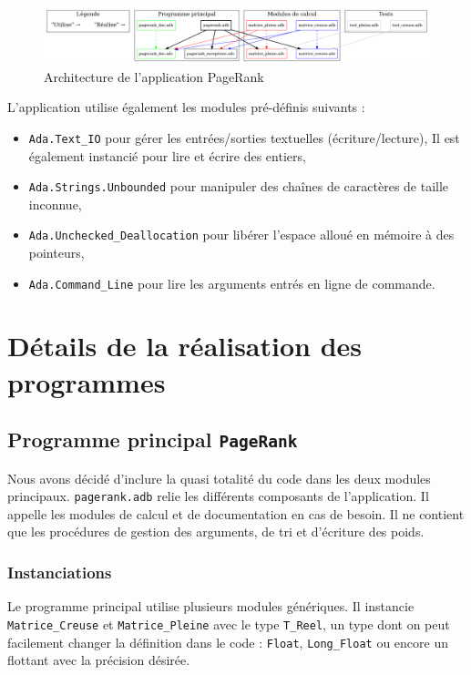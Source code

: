\documentclass{article}
\begin{document}
\begin{figure}[H]
    \centering
    \includegraphics[width=\textwidth]{archi.png}
    \caption{Architecture de l'application PageRank}
\end{figure}

\noindent L'application utilise également les modules pré-définis suivants :
\begin{itemize}
    \item \texttt{Ada.Text\_IO} pour gérer les entrées/sorties textuelles (écriture/lecture), Il est également instancié pour lire et écrire des entiers,
    \item \texttt{Ada.Strings.Unbounded} pour manipuler des chaînes de caractères de taille inconnue,
    \item \texttt{Ada.Unchecked\_Deallocation} pour libérer l'espace alloué en mémoire à des pointeurs,
    \item \texttt{Ada.Command\_Line} pour lire les arguments entrés en ligne de commande.
\end{itemize}

\section{Détails de la réalisation des programmes}

\subsection{Programme principal \texttt{PageRank}}

Nous avons décidé d'inclure la quasi totalité du code dans les deux modules principaux.  \texttt{pagerank.adb} relie les différents composants de l'application. Il appelle les modules de calcul et de documentation en cas de besoin. Il ne contient que les procédures de gestion des arguments, de tri et d'écriture des poids.

\subsubsection{Instanciations}

Le programme principal utilise plusieurs modules génériques. Il instancie \texttt{Matrice\_Creuse} et \texttt{Matrice\_Pleine} avec le type \texttt{T\_Reel}, un type dont on peut facilement changer la définition dans le code : \texttt{Float}, \texttt{Long\_Float} ou encore un flottant avec la précision désirée.
\end{document}
